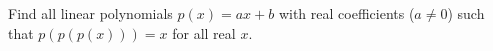 Find all linear polynomials $p(x)=ax+b$ with real coefficients ($a\ne0$) such that $p(p(p(x)))=x$ for all real $x$.
